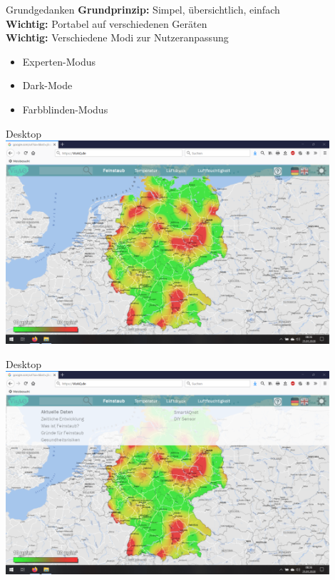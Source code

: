 \begin{frame}{Grundgedanken}
    \textbf{Grundprinzip:} Simpel, übersichtlich, einfach
    \\
    \pause
    \vspace{1cm}
    \textbf{Wichtig:} Portabel auf verschiedenen Geräten
    \\
    \pause
    \vspace{1cm}
    \textbf{Wichtig:} Verschiedene Modi zur Nutzeranpassung
    \begin{itemize}
        \item Experten-Modus
        \item Dark-Mode
        \item Farbblinden-Modus
    \end{itemize}
\end{frame}
\begin{frame}{Desktop}
    \includegraphics[width=0.9\textwidth]{../../media/Startseite}
\end{frame}
\begin{frame}{Desktop}
    \includegraphics[width=0.9\textwidth]{../../media/Menue}
\end{frame}
